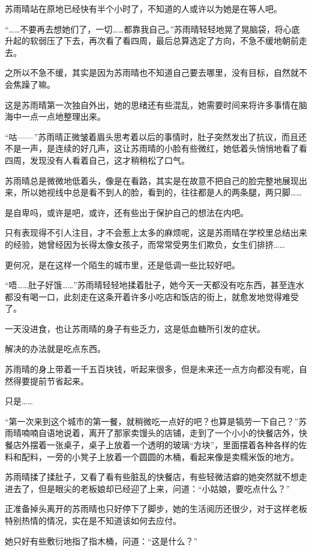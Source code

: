 苏雨晴站在原地已经快有半个小时了，不知道的人或许以为她是在等人吧。

“……不要再去想她们了，一切……都靠我自己。”苏雨晴轻轻地晃了晃脑袋，将心底升起的软弱压了下去，再次看了看四周，最后总算选定了方向，不急不缓地朝前走去。

之所以不急不缓，其实是因为苏雨晴也不知道自己要去哪里，没有目标，自然就不会焦躁了嘛。

这是苏雨晴第一次独自外出，她的思绪还有些混乱，她需要时间来将许多事情在脑海中一点一点地整理出来。

“咕——”苏雨晴正微皱着眉头思考着以后的事情时，肚子突然发出了抗议，而且还不是一声，是连续的好几声，这让苏雨晴的小脸有些微红，她低着头悄悄地看了看四周，发现没有人看着自己，这才稍稍松了口气。

苏雨晴总是微微地低着头，像是在看路，其实是在故意不把自己的脸完整地展现出来，所以她视线中总是看不到人的脸，看到的，往往都是人的两条腿，两只脚……

是自卑吗，或许是吧，或许，还有些出于保护自己的想法在内吧。

只有表现得不引人注目，才不会惹上太多的麻烦呢，这是苏雨晴在学校里总结出来的经验，她曾经因为长得太像女孩子，而常常受男生们欺负，女生们排挤……

更何况，是在这样一个陌生的城市里，还是低调一些比较好吧。

“唔……肚子好饿……”苏雨晴轻轻地揉着肚子，她今天一天都没有吃东西，甚至连水都没有喝一口，此刻走在这条开着许多小吃店和饭店的街上，就愈发地觉得难受了。

一天没进食，也让苏雨晴的身子有些乏力，这是低血糖所引发的症状。

解决的办法就是吃点东西。

苏雨晴的身上带着一千五百块钱，听起来很多，但是未来还一点方向都没有呢，自然得要提前节省起来。

只是……

“第一次来到这个城市的第一餐，就稍微吃一点好的吧？也算是犒劳一下自己？”苏雨晴喃喃自语地说着，离开了那家卖馒头的店铺，走到了一个小小的快餐店外，快餐店外摆着一张桌子，桌子上放着一个透明的玻璃“方块”，里面摆着各种各样的佐料和配料，一旁的小凳子上放着一个圆圆的木桶，看起来像是卖糯米饭的地方。

苏雨晴揉了揉肚子，又看了看有些脏乱的快餐店，有些轻微洁癖的她突然就不想走进去了，但是眼尖的老板娘却已经迎了上来，问道：“小姑娘，要吃点什么？”

正准备掉头离开的苏雨晴也只好停下了脚步，她的生活阅历还很少，对于这样老板特别热情的情况，实在是不知道该如何去应付。

她只好有些敷衍地指了指木桶，问道：“这是什么？”

